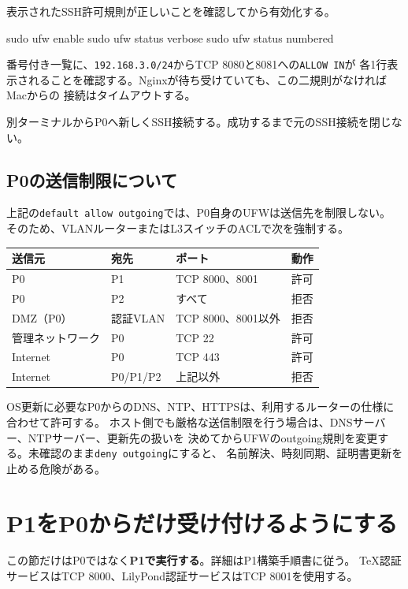 \documentclass[uplatex,a4paper,11pt]{jsarticle}
\begin{document}
表示されたSSH許可規則が正しいことを確認してから有効化する。

\begin{command}
sudo ufw enable
sudo ufw status verbose
sudo ufw status numbered
\end{command}

番号付き一覧に、\texttt{192.168.3.0/24}からTCP 8080と8081への\texttt{ALLOW IN}が
各1行表示されることを確認する。Nginxが待ち受けていても、この二規則がなければMacからの
接続はタイムアウトする。

別ターミナルからP0へ新しくSSH接続する。成功するまで元のSSH接続を閉じない。

\subsection{P0の送信制限について}

上記の\texttt{default allow outgoing}では、P0自身のUFWは送信先を制限しない。
そのため、VLANルーターまたはL3スイッチのACLで次を強制する。

\begin{longtable}{@{}p{34mm}p{40mm}p{30mm}p{38mm}@{}}
\toprule
送信元 & 宛先 & ポート & 動作\\
\midrule
P0 & P1 & TCP 8000、8001 & 許可\\
P0 & P2 & すべて & 拒否\\
DMZ（P0） & 認証VLAN & TCP 8000、8001以外 & 拒否\\
管理ネットワーク & P0 & TCP 22 & 許可\\
Internet & P0 & TCP 443 & 許可\\
Internet & P0/P1/P2 & 上記以外 & 拒否\\
\bottomrule
\end{longtable}

OS更新に必要なP0からのDNS、NTP、HTTPSは、利用するルーターの仕様に合わせて許可する。
ホスト側でも厳格な送信制限を行う場合は、DNSサーバー、NTPサーバー、更新先の扱いを
決めてからUFWのoutgoing規則を変更する。未確認のまま\texttt{deny outgoing}にすると、
名前解決、時刻同期、証明書更新を止める危険がある。

\section{P1をP0からだけ受け付けるようにする}

この節だけはP0ではなく\textbf{P1で実行する}。詳細はP1構築手順書に従う。
TeX認証サービスはTCP 8000、LilyPond認証サービスはTCP 8001を使用する。
\end{document}

